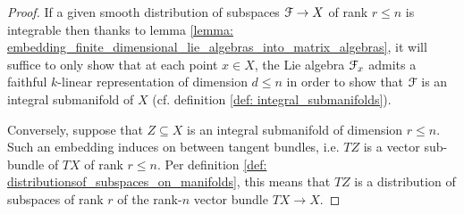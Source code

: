             \begin{proof}
                If a given smooth distribution of subspaces $\mathcal{F} \to X$ of rank $r \leq n$ is integrable then thanks to lemma \ref{lemma: embedding_finite_dimensional_lie_algebras_into_matrix_algebras}, it will suffice to only show that at each point $x \in X$, the Lie algebra $\mathcal{F}_x$ admits a faithful $k$-linear representation of dimension $d \leq n$ in order to show that $\mathcal{F}$ is an integral submanifold of $X$ (cf. definition \ref{def: integral_submanifolds}).
                
                Conversely, suppose that $Z \subseteq X$ is an integral submanifold of dimension $r \leq n$. Such an embedding induces on between tangent bundles, i.e. $TZ$ is a vector sub-bundle of $TX$ of rank $r \leq n$. Per definition \ref{def: distributionsof_subspaces_on_manifolds}, this means that $TZ$ is a distribution of subspaces of rank $r$ of the rank-$n$ vector bundle $TX \to X$. 
            \end{proof}
        
